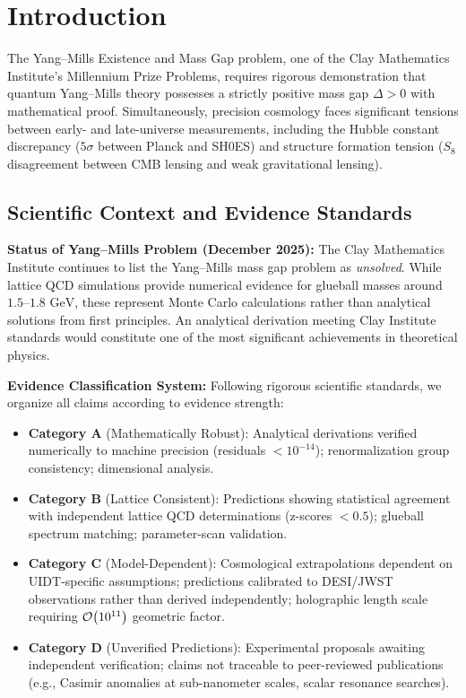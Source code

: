 \documentclass[12pt,a4paper,twoside]{article}
\theoremstyle{plain}
\theoremstyle{definition}
\theoremstyle{remark}
\newcommand{\UIDT}{\textsc{UIDT}}
\newcommand{\GeV}{\,\mathrm{GeV}}
\begin{document}
\section{Introduction}
\label{sec:introduction}

The Yang--Mills Existence and Mass Gap problem, one of the Clay Mathematics 
Institute's Millennium Prize Problems, requires rigorous demonstration that 
quantum Yang--Mills theory possesses a strictly positive mass gap $\Delta > 0$ 
with mathematical proof. Simultaneously, precision cosmology faces significant 
tensions between early- and late-universe measurements, including the Hubble 
constant discrepancy ($5\sigma$ between Planck and SH0ES) and structure 
formation tension ($S_8$ disagreement between CMB lensing and weak gravitational lensing).

\subsection{Scientific Context and Evidence Standards}

\textbf{Status of Yang--Mills Problem (December 2025):} The Clay Mathematics 
Institute continues to list the Yang--Mills mass gap problem as \emph{unsolved}. 
While lattice QCD simulations provide numerical evidence for glueball masses 
around $1.5$--$1.8\,\GeV$, these represent Monte Carlo calculations rather than 
analytical solutions from first principles. An analytical derivation meeting 
Clay Institute standards would constitute one of the most significant achievements 
in theoretical physics.

\textbf{Evidence Classification System:} Following rigorous scientific standards, 
we organize all claims according to evidence strength:

\begin{itemize}
    \item \textbf{Category A} (Mathematically Robust): Analytical derivations 
    verified numerically to machine precision (residuals $< 10^{-14}$); 
    renormalization group consistency; dimensional analysis.
    
    \item \textbf{Category B} (Lattice Consistent): Predictions showing statistical 
    agreement with independent lattice QCD determinations (z-scores $< 0.5$); 
    glueball spectrum matching; parameter-scan validation.
    
    \item \textbf{Category C} (Model-Dependent): Cosmological extrapolations 
    dependent on \UIDT{}-specific assumptions; predictions calibrated to DESI/JWST 
    observations rather than derived independently; holographic length scale 
    requiring $\order{10^{11}}$ geometric factor.
    
    \item \textbf{Category D} (Unverified Predictions): Experimental proposals 
    awaiting independent verification; claims not traceable to peer-reviewed 
    publications (e.g., Casimir anomalies at sub-nanometer scales, scalar 
    resonance searches).
\end{itemize}
\end{document}
